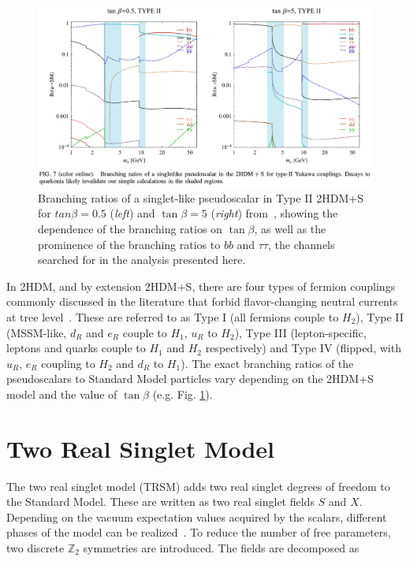 \begin{figure}[ht]
    \centering
    \includegraphics[width=15cm]{figures/ch-1-introduction/curtin-2014-figure-7-BRs-of-singlelike-pseudoscalar-type-II.png}
    \caption[Branching ratios of a singlet-like pseudoscalar in Type II 2HDM+S for $\tan\beta = 0.5$ (left) and $\tan\beta = 5$ (right).]{Branching ratios of a singlet-like pseudoscalar in Type II 2HDM+S for $tan\beta = 0.5$ (\textit{left}) and $\tan\beta = 5$ (\textit{right}) from~\cite{2HDM-PhysRevD.90.075004}, showing the dependence of the branching ratios on $\tan\beta$, as well as the prominence of the branching ratios to $bb$ and $\tau\tau$, the channels searched for in the analysis presented here.}
    \label{fig:curtin-2014-fig-4-typeI-BRs}
\end{figure}


In 2HDM, and by extension 2HDM+S, there are four types of fermion couplings commonly discussed in the literature that forbid flavor-changing neutral currents at tree level~\cite{2HDM-PhysRevD.90.075004}. These are referred to as Type I (all fermions couple to $H_2$), Type II (MSSM-like, $d_R$ and $e_R$ couple to $H_1$, $u_R$ to $H_2$), Type III (lepton-specific, leptons and quarks couple to $H_1$ and $H_2$ respectively) and Type IV (flipped, with $u_R$, $e_R$ coupling to $H_2$ and $d_R$ to $H_1$). The exact branching ratios of the pseudoscalars to Standard Model particles vary depending on the 2HDM+S model and the value of $\tan\beta$ (e.g. Fig. \ref{fig:curtin-2014-fig-4-typeI-BRs}).

\section{Two Real Singlet Model}
\label{section:theory-TRSM}
The two real singlet model (TRSM) adds two real singlet degrees of freedom to the Standard Model. These are written as two real singlet fields $S$ and $X$. Depending on the vacuum expectation values acquired by the scalars, different phases of the model can be realized~\cite{Robens:2019kga}. To reduce the number of free parameters, two discrete $\mathbb{Z}_2$ symmetries are introduced. The fields are decomposed as

